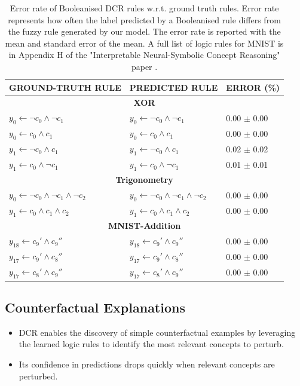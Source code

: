 \documentclass[10pt, oneside]{article}
\begin{document}
\begin{table}
   \centering
   \caption{Error rate of Booleanised DCR rules w.r.t. ground truth rules. Error rate represents how often the label predicted by a Booleanised rule differs from the fuzzy rule generated by our model. The error rate is reported with the mean and standard error of the mean. A full list of logic rules for MNIST is in Appendix H of the "Interpretable Neural-Symbolic Concept Reasoning" paper \cite{dcr}.}
   \begin{tabular}{lll}
   \toprule
   \textbf{GROUND-TRUTH RULE} & \textbf{PREDICTED RULE} & \textbf{ERROR (\%)} \\
   \midrule
   \multicolumn{3}{c}{\textbf{XOR}} \\
   \midrule
   $y_0 \leftarrow \neg c_0 \wedge \neg c_1$ & $y_0 \leftarrow \neg c_0 \wedge \neg c_1$ & \num{0.00} $\pm$ \num{0.00} \\
   $y_0 \leftarrow c_0 \wedge c_1$ & $y_0 \leftarrow c_0 \wedge c_1$ & \num{0.00} $\pm$ \num{0.00} \\
   $y_1 \leftarrow \neg c_0 \wedge c_1$ & $y_1 \leftarrow \neg c_0 \wedge c_1$ & \num{0.02} $\pm$ \num{0.02} \\
   $y_1 \leftarrow c_0 \wedge \neg c_1$ & $y_1 \leftarrow c_0 \wedge \neg c_1$ & \num{0.01} $\pm$ \num{0.01} \\
   \midrule
   \multicolumn{3}{c}{\textbf{Trigonometry}} \\
   \midrule
   $y_0 \leftarrow \neg c_0 \wedge \neg c_1 \wedge \neg c_2$ & $y_0 \leftarrow \neg c_0 \wedge \neg c_1 \wedge \neg c_2$ & \num{0.00} $\pm$ \num{0.00} \\
   $y_1 \leftarrow c_0 \wedge c_1 \wedge c_2$ & $y_1 \leftarrow c_0 \wedge c_1 \wedge c_2$ & \num{0.00} $\pm$ \num{0.00} \\
   \midrule
   \multicolumn{3}{c}{\textbf{MNIST-Addition}} \\
   \midrule
   $y_{18} \leftarrow c_9' \wedge c_9''$ & $y_{18} \leftarrow c_9' \wedge c_9''$ & \num{0.00} $\pm$ \num{0.00} \\
   $y_{17} \leftarrow c_9' \wedge c_8''$ & $y_{17} \leftarrow c_9' \wedge c_8''$ & \num{0.00} $\pm$ \num{0.00} \\
   $y_{17} \leftarrow c_8' \wedge c_9''$ & $y_{17} \leftarrow c_8' \wedge c_9''$ & \num{0.00} $\pm$ \num{0.00} \\
   \bottomrule
   \end{tabular}
\end{table}

\subsection{Counterfactual Explanations}
\begin{itemize}
   \item DCR enables the discovery of simple counterfactual examples by leveraging the learned logic rules to identify the most relevant concepts to perturb.
   \item Its confidence in predictions drops quickly when relevant concepts are perturbed.
\end{itemize}
\end{document}
